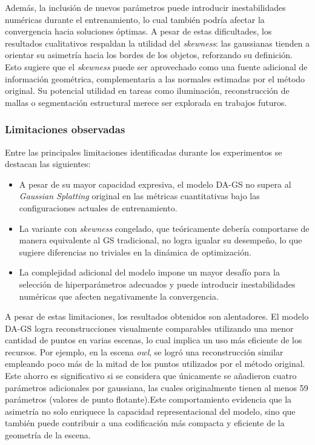 Además, la inclusión de nuevos parámetros puede introducir inestabilidades numéricas durante el entrenamiento, lo cual también podría afectar la convergencia hacia soluciones óptimas. A pesar de estas dificultades, los resultados cualitativos respaldan la utilidad del \textit{skewness}: las gaussianas tienden a orientar su asimetría hacia los bordes de los objetos, reforzando su definición. Esto sugiere que el \textit{skewness} puede ser aprovechado como una fuente adicional de información geométrica, complementaria a las normales estimadas por el método original. Su potencial utilidad en tareas como iluminación, reconstrucción de mallas o segmentación estructural merece ser explorada en trabajos futuros.

\subsubsection{Limitaciones observadas}

Entre las principales limitaciones identificadas durante los experimentos se destacan las siguientes:

\begin{itemize}
    \item A pesar de su mayor capacidad expresiva, el modelo DA-GS no supera al \textit{Gaussian Splatting} original en las métricas cuantitativas bajo las configuraciones actuales de entrenamiento.
    \item La variante con \textit{skewness} congelado, que teóricamente debería comportarse de manera equivalente al GS tradicional, no logra igualar su desempeño, lo que sugiere diferencias no triviales en la dinámica de optimización.
    \item La complejidad adicional del modelo impone un mayor desafío para la selección de hiperparámetros adecuados y puede introducir inestabilidades numéricas que afecten negativamente la convergencia.
\end{itemize}

A pesar de estas limitaciones, los resultados obtenidos son alentadores. El modelo DA-GS logra reconstrucciones visualmente comparables utilizando una menor cantidad de puntos en varias escenas, lo cual implica un uso más eficiente de los recursos. Por ejemplo, en la escena \textit{owl}, se logró una reconstrucción similar empleando poco más de la mitad de los puntos utilizados por el método original. Este ahorro es significativo si se considera que únicamente se añadieron cuatro parámetros adicionales por gaussiana, las cuales originalmente tienen al menos 59 parámetros (valores de punto flotante).Este comportamiento evidencia que la asimetría no solo enriquece la capacidad representacional del modelo, sino que también puede contribuir a una codificación más compacta y eficiente de la geometría de la escena.

